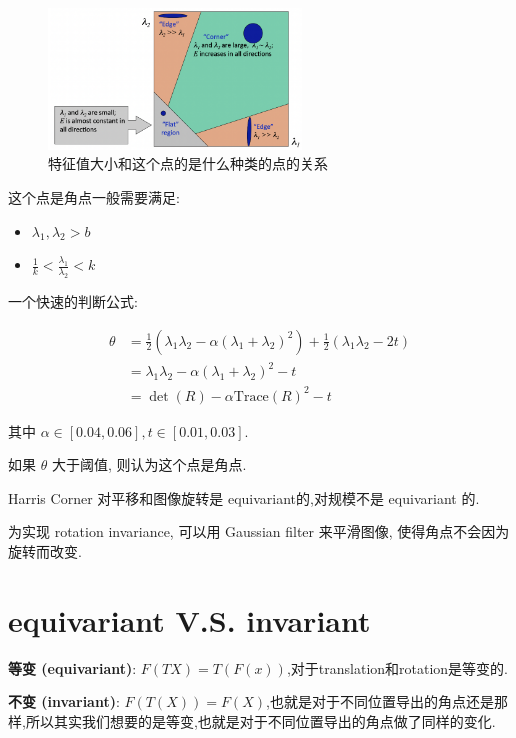 \documentclass[lang=cn,10pt,green]{elegantbook}
\begin{document}
\begin{figure}[htbp]
    \centering
    \includegraphics[width=0.6\textwidth]{figures/corner_map.png}
    \caption{特征值大小和这个点的是什么种类的点的关系}
\end{figure}
\begin{proposition}
    

这个点是角点一般需要满足:

\begin{itemize}
    \item $\lambda_1, \lambda_2>b$
    \item $\frac{1}{k}<\frac{\lambda_1}{\lambda_2}<k$
\end{itemize}

一个快速的判断公式:

\begin{equation}
\begin{aligned}
\theta&=\frac 12(\lambda_1\lambda_2-\alpha(\lambda_1+\lambda_2)^2)+\frac12(\lambda_1\lambda_2-2t)\\
&=\lambda_1\lambda_2-\alpha(\lambda_1+\lambda_2)^2-t\\
&=\det(R)-\alpha\text{Trace}(R)^2-t
\end{aligned}
\end{equation}

其中 $\alpha\in[0.04,0.06], t\in[0.01,0.03]$.

如果 $\theta$ 大于阈值, 则认为这个点是角点.
\end{proposition}
\begin{note}
Harris Corner 对平移和图像旋转是 equivariant的,对规模不是 equivariant 的.

为实现 rotation invariance, 可以用 Gaussian filter 来平滑图像, 使得角点不会因为旋转而改变.
\end{note}
\section{equivariant V.S. invariant}
\begin{definition}
    

\textbf{等变 (equivariant)}: $F(TX)=T(F(x))$,对于translation和rotation是等变的.

\textbf{不变 (invariant)}: $F(T(X))=F(X)$,也就是对于不同位置导出的角点还是那样,所以其实我们想要的是等变,也就是对于不同位置导出的角点做了同样的变化.
\end{definition}
\end{document}

